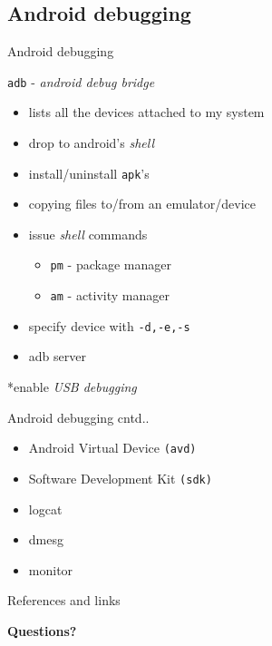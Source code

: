 \documentclass{beamer}
\begin{document}
 \subsection{Android debugging}
 \begin{frame}{Android debugging}
   \begin{block}{{\tt adb} - {\em android debug bridge}}
     \begin{itemize} \pause
       \item lists all the devices attached to my system\pause
       \item drop to android's {\em shell} \pause
       \item install/uninstall {\tt apk}'s \pause
       \item copying files to/from an emulator/device \pause
       \item issue {\em shell} commands \pause
         \begin{itemize}
         \item {\tt pm} - package manager 
         \item {\tt am} - activity manager
         \end{itemize} \pause
       \item specify device with {\tt -d,-e,-s} \pause
       \item adb server
     \end{itemize}
   \end{block}
   \pause
   *enable {\em USB debugging}
 \end{frame}

 \begin{frame}{Android debugging cntd..}
   \begin{block}{}
     \begin{itemize}
       \item Android Virtual Device {\tt (avd)}
       \item Software Development Kit {\tt (sdk)}
       \item logcat
       \item dmesg
       \item monitor
     \end{itemize}
   \end{block}
 \end{frame}

 \begin{frame}{References and links}
   \begin{block}{}
   \end{block}
 \end{frame}

\begin{frame}{}
  \centerline{\bf Questions?}
\end{frame}
\end{document}
